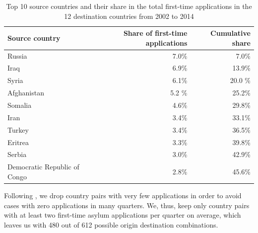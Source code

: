 \documentclass[a4paper,12pt]{article}
\begin{document}
\begin{table}[htbp]\centering
\caption{Top 10 source countries and their share in the total first-time applications in the 12 destination countries from 2002 to 2014}
\begin{tabular}{l r r}
\hline \hline
\textbf{Source country} & \textbf{ Share of first-time  applications}   & \textbf{Cumulative share } \\
\hline \hline
\smallskip
Russia &  7.0\% & 7.0\% \\
\smallskip
Iraq & 6.9\%  & 13.9\% \\
\smallskip
Syria & 6.1\%  & 20.0 \%  \\
\smallskip
Afghanistan & 5.2 \% & 25.2\% \\
\smallskip
Somalia & 4.6\% & 29.8\%  \\
\smallskip
Iran & 3.4\% & 33.1\%  \\
\smallskip
Turkey  & 3.4\% & 36.5\% \\
\smallskip 
Eritrea & 3.3\% & 39.8\% \\
\smallskip
Serbia & 3.0\% & 42.9\% \\
\smallskip
Democratic Republic of Congo  & 2.8\% & 45.6\% \\
\hline \hline
\end{tabular}
\end{table}

Following \cite{hatton2016}, we drop country pairs with very few applications in order to avoid cases with zero applications in many quarters. We, thus, keep only country pairs with at least two first-time asylum applications per quarter on average, which leaves us with 480 out of 612 possible origin destination combinations.
\end{document}
